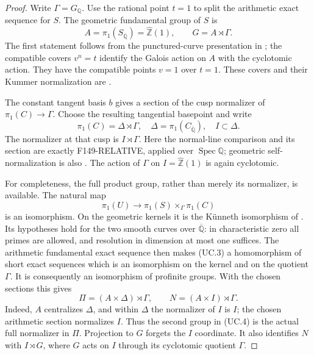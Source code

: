 \documentclass[11pt,a4paper]{article}
\theoremstyle{definition}
\begin{document}
\begin{proof}
Write $\Gamma=G_{\mathbb Q}$. Use the rational point $t=1$ to
split the arithmetic exact sequence for $S$. The geometric
fundamental group of $S$ is
\[
 A=\pi_1(S_{\overline{\mathbb Q}})=\widehat{\mathbb Z}(1),
 \qquad G=A\rtimes\Gamma.                                  \tag{UC.2}
\]
The first statement follows from the punctured-curve presentation
in \cite[Expos\'e XIII, Corollaire~2.12, pp.~290--292]{SGA1};
the compatible covers $v^n=t$ identify the Galois action on $A$
with the cyclotomic action. They have the compatible points $v=1$
over $t=1$. These covers and their Kummer normalization are
\cite[Expos\'e XI, Proposition~6.1 and \S6.2--6.5,
pp.~233--235]{SGA1}.

The constant tangent basis $b$ gives a section of the cusp
normalizer of $\pi_1(C)\to\Gamma$. Choose the resulting tangential
basepoint and write
\[
 \pi_1(C)=\Delta\rtimes\Gamma,
 \quad \Delta=\pi_1(C_{\overline{\mathbb Q}}),
 \quad I\subset\Delta.
\]
The normalizer at that cusp is $I\rtimes\Gamma$.
Here the normal-line comparison and its section are exactly
F149-RELATIVE, applied over $\operatorname{Spec}\mathbb Q$;
geometric self-normalization is also
\cite[Proposition~16, p.~8]{StixCuspidal2012}.
The action of $\Gamma$ on $I=\widehat{\mathbb Z}(1)$ is again
cyclotomic.

For completeness, the full product group, rather than merely
its normalizer, is available. The natural map
\[
 \pi_1(U)\longrightarrow
        \pi_1(S)\mathbin{\times}_{\Gamma}\pi_1(C)             \tag{UC.3}
\]
is an isomorphism. On the geometric kernels it is the
K\"unneth isomorphism of
\cite[Expos\'e XIII, Proposition~4.6, pp.~310--311]{SGA1}.
Its hypotheses hold for the two smooth curves over
$\overline{\mathbb Q}$: in characteristic zero all primes are
allowed, and resolution in dimension at most one suffices.
The arithmetic fundamental exact sequence
\cite[Expos\'e IX, Th\'eor\`eme~6.1, p.~195]{SGA1} then makes
(UC.3) a homomorphism of short exact sequences which is an
isomorphism on the kernel and on the quotient $\Gamma$.
It is consequently an isomorphism of profinite groups.
With the chosen sections this gives
\[
 \Pi=(A\times\Delta)\rtimes\Gamma,
 \qquad N=(A\times I)\rtimes\Gamma.                         \tag{UC.4}
\]
Indeed, $A$ centralizes $\Delta$, and within $\Delta$ the
normalizer of $I$ is $I$; the chosen arithmetic section normalizes
$I$. Thus the second group in (UC.4) is the actual full
normalizer in $\Pi$. Projection to $G$ forgets the $I$ coordinate.
It also identifies $N$ with $I\rtimes G$, where $G$ acts on $I$
through its cyclotomic quotient $\Gamma$.


\end{proof}
\end{document}
